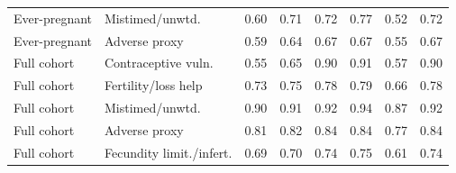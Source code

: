\begin{table}[H]
\begin{tabular*}{\textwidth}{@{\extracolsep{\fill}}>{\raggedright\arraybackslash}p{}>{\raggedright\arraybackslash}p{}cccccc@{}}
\midrule
Ever-pregnant & Mistimed/unwtd. & 0.60 & 0.71 & 0.72 & 0.77 & 0.52 & 0.72 \\
Ever-pregnant & Adverse proxy & 0.59 & 0.64 & 0.67 & 0.67 & 0.55 & 0.67 \\
Full cohort & Contraceptive vuln. & 0.55 & 0.65 & 0.90 & 0.91 & 0.57 & 0.90 \\
Full cohort & Fertility/loss help & 0.73 & 0.75 & 0.78 & 0.79 & 0.66 & 0.78 \\
Full cohort & Mistimed/unwtd. & 0.90 & 0.91 & 0.92 & 0.94 & 0.87 & 0.92 \\
Full cohort & Adverse proxy & 0.81 & 0.82 & 0.84 & 0.84 & 0.77 & 0.84 \\
Full cohort & Fecundity limit./infert. & 0.69 & 0.70 & 0.74 & 0.75 & 0.61 & 0.74 \\
\bottomrule
\end{tabular*}
\end{table}
